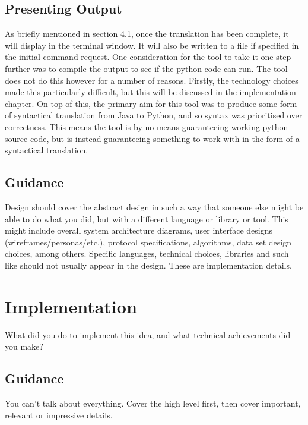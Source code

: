 \documentclass{l4proj}
\begin{document}
\section{Presenting Output}
As briefly mentioned in section 4.1, once the translation has been complete, it will display in the terminal window. It will also be written to a file if specified in the initial command request. One consideration for the tool to take it one step further was to compile the output to see if the python code can run. The tool does not do this however for a number of reasons. Firstly, the technology choices made this particularly difficult, but this will be discussed in the implementation chapter. On top of this, the primary aim for this tool was to produce some form of syntactical translation from Java to Python, and so syntax was prioritised over correctness. This means the tool is by no means guaranteeing working python source code, but is instead guaranteeing something to work with in the form of a syntactical translation. 





\section{Guidance}
Design should cover the abstract design in such a way that someone else might be able to do what you did, 
but with a different language or library or tool. This might include overall system architecture diagrams,
user interface designs (wireframes/personas/etc.), protocol specifications, algorithms, data set design choices,
among others. Specific languages, technical choices, libraries and such like should not usually appear in the design. These are implementation details.


\chapter{Implementation}
What did you do to implement this idea, and what technical achievements did you make?
\section{Guidance}
You can't talk about everything. Cover the high level first, then cover important, relevant or impressive details.
\end{document}
